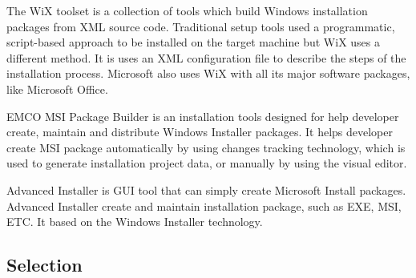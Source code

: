 The WiX toolset is a collection of tools which build Windows installation packages from XML source code.
Traditional setup tools used a programmatic, script-based approach to be installed on the target machine but WiX uses a different method.
It is uses an XML configuration file to describe the steps of the installation process.
Microsoft also uses WiX with all its major software packages, like Microsoft Office.
\cite{Wix_tool}


EMCO MSI Package Builder is an installation tools designed for help developer create, maintain and distribute Windows Installer packages.
\cite{EMCO_MSI}
It helps developer create MSI package automatically by using changes tracking technology, which is used to generate installation project data, or manually by using the visual editor.


Advanced Installer is GUI tool that can simply create Microsoft Install packages.
Advanced Installer create and maintain installation package, such as EXE, MSI, ETC.
It based on the Windows Installer technology.
\cite{advanced_install}

\subsection{Selection}


